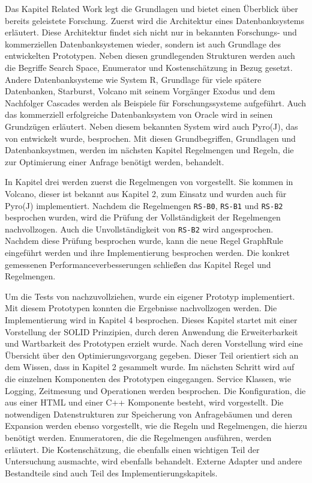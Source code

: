 Das Kapitel Related Work legt die Grundlagen und bietet einen Überblick über bereits geleistete Forschung. Zuerst wird die Architektur eines Datenbanksystems erläutert. Diese Architektur findet sich nicht nur in bekannten Forschungs- und kommerziellen Datenbanksystemen wieder, sondern ist auch Grundlage des entwickelten Prototypen. Neben diesen grundlegenden Strukturen werden auch die Begriffe Search Space, Enumerator und Kostenschätzung in Bezug gesetzt. Andere Datenbanksysteme wie System R, Grundlage für viele spätere Datenbanken, Starburst, Volcano mit seinem Vorgänger Exodus und dem Nachfolger Cascades werden als Beispiele für Forschungssysteme aufgeführt. Auch das kommerziell erfolgreiche Datenbanksystem von Oracle wird in seinen Grundzügen erläutert. Neben diesem bekannten System wird auch Pyro(J), das von \cite{roy2001multi} entwickelt wurde, besprochen. Mit diesen Grundbegriffen, Grundlagen und Datenbanksystmen, werden im nächsten Kapitel Regelmengen und Regeln, die zur Optimierung einer Anfrage benötigt werden, behandelt.

In Kapitel drei werden zuerst die Regelmengen von \cite{pellenkoft1997complexity} vorgestellt. Sie kommen in Volcano, dieser ist bekannt aus Kapitel 2, zum Einsatz und wurden auch für Pyro(J) implementiert. Nachdem die Regelmengen \texttt{RS-B0}, \texttt{RS-B1} und \texttt{RS-B2} besprochen wurden, wird die Prüfung der Vollständigkeit der Regelmengen nachvollzogen. Auch die Unvollständigkeit von \texttt{RS-B2} wird angesprochen. Nachdem diese Prüfung besprochen wurde, kann die neue Regel GraphRule eingeführt werden und ihre Implementierung besprochen werden. Die konkret gemessenen Performanceverbesserungen schließen das Kapitel Regel und Regelmengen.



Um die Tests von \cite{shanbhag2014optimizing} nachzuvollziehen, wurde ein eigener Prototyp implementiert. Mit diesem Prototypen konnten die Ergebnisse nachvollzogen werden. Die Implementierung wird in Kapitel 4 besprochen. Dieses Kapitel startet mit einer Vorstellung der SOLID Prinzipien, durch deren Anwendung die Erweiterbarkeit und Wartbarkeit des Prototypen erzielt wurde. Nach deren Vorstellung wird eine Übersicht über den Optimierungsvorgang gegeben. Dieser Teil orientiert sich an dem Wissen, dass in Kapitel 2 gesammelt wurde. Im nächsten Schritt wird auf die einzelnen Komponenten des Prototypen eingegangen. Service Klassen, wie Logging, Zeitmesung und Operationen werden besprochen. Die Konfiguration, die aus einer HTML und einer C++ Komponente besteht, wird vorgestellt. Die notwendigen Datenstrukturen zur Speicherung von Anfragebäumen und deren Expansion werden ebenso vorgestellt, wie die Regeln und Regelmengen, die hierzu benötigt werden. Enumeratoren, die die Regelmengen ausführen, werden erläutert. Die Kostenschätzung, die ebenfalls einen wichtigen Teil der Untersuchung ausmachte, wird ebenfalls behandelt. Externe Adapter und andere Bestandteile sind auch Teil des Implementierungskapitels.


